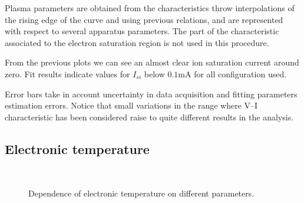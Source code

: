 \documentclass[11pt,a4 paper]{article}
\begin{document}
Plasma parameters are obtained from the characteristics throw interpolations of the rising edge of the curve and using previous relations, and are represented with respect to several apparatus parameters. The part of the characteristic associated to the electron saturation region is not used in this procedure.

From the previous plots we can see an almost clear ion saturation current around zero. Fit results indicate values for $I_{si}$ below $0.1\si{\milli\ampere}$ for all configuration used.

Error bars take in account uncertainty in data acquisition and fitting parameters estimation errors.
Notice that small variations in the  range where V--I characteristic has been considered raise to quite different results in the analysis.

\subsection{Electronic temperature}
\begin{figure}[H]
\\%
 \caption{Dependence of electronic temperature on different parameters.}\label{fig:Te}%
\end{figure}%
\end{document}
